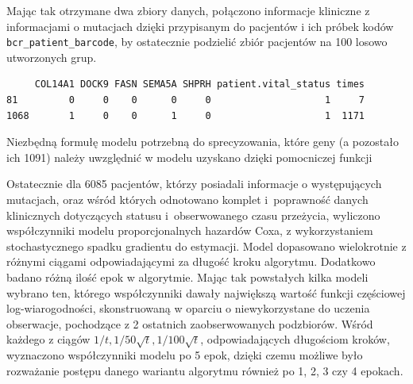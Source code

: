 Mając tak otrzymane dwa zbiory danych, połączono informacje kliniczne z informacjami o mutacjach dzięki przypisanym do
pacjentów i ich próbek kodów \texttt{bcr\_patient\_barcode}, by
ostatecznie podzielić zbiór pacjentów na 100 losowo utworzonych grup.

\begin{Shaded}
\begin{Highlighting}[]
\NormalTok{(}\NormalTok{)}
 \NormalTok{) ->}\StringTok{ }
\NormalTok{(coxData_split[[}\NormalTok{]][}\NormalTok{(}\NormalTok{,}\NormalTok{), }\NormalTok{(}\NormalTok{,}\NormalTok{,}\NormalTok{,}\NormalTok{,}\NormalTok{,}\NormalTok{:}\NormalTok{)])}
\end{Highlighting}
\end{Shaded}

\begin{verbatim}
     COL14A1 DOCK9 FASN SEMA5A SHPRH patient.vital_status times
81         0     0    0      0     0                    1     7
1068       1     0    0      1     0                    1  1171
\end{verbatim}

Niezbędną formułę modelu potrzebną do sprecyzowania, które geny (a
pozostało ich 1091) należy uwzględnić w modelu uzyskano dzięki
pomocniczej funkcji

\begin{Shaded}
\begin{Highlighting}[]
\StringTok{ }
\end{Highlighting}
\end{Shaded}

Ostatecznie dla 6085 pacjentów, którzy posiadali informacje o
występujących mutacjach, oraz wśród których odnotowano komplet i~poprawność danych klinicznych dotyczących statusu i~obserwowanego czasu
przeżycia, wyliczono współczynniki modelu proporcjonalnych hazardów Coxa,
z wykorzystaniem stochastycznego spadku gradientu do estymacji. Model
dopasowano wielokrotnie z różnymi ciągami odpowiadającymi za długość
kroku algorytmu. Dodatkowo badano różną ilość epok w algorytmie. Mając tak
powstałych kilka modeli wybrano ten, którego współczynniki
dawały największą wartość funkcji częściowej log-wiarogodności, skonstruowaną w oparciu o 
niewykorzystane do uczenia obserwacje, pochodzące z 2 ostatnich
zaobserwowanych podzbiorów. Wśród każdego z ciągów
\(1/t, 1/50\sqrt{t}, 1/100\sqrt{t}\), odpowiadających długościom
kroków, wyznaczono współczynniki modelu po 5 epok, dzięki
czemu możliwe było rozważanie postępu danego wariantu algorytmu również
po 1, 2, 3 czy 4 epokach.

